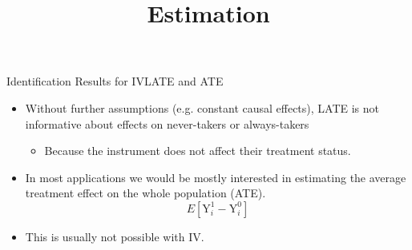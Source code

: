 \documentclass[dvipsnames,hyperref={pdfpagelabels=false}]{beamer}
\begin{document}
\begin{frame}{Identification Results for IV}{LATE and ATE}
	\begin{itemize}
		\item Without further assumptions (e.g. constant causal effects), LATE is not informative about effects on never-takers or always-takers
		\vspace{0.2cm}
		\begin{itemize}
			\item Because the instrument does not affect their treatment status.
			\vspace{0.2cm}
		\end{itemize}
		\item In most applications we would be mostly interested in estimating the average treatment effect on the whole population (ATE).
		\begin{equation*}
		E[\mathrm{Y}^{1}_{i}-\mathrm{Y}^{0}_{i}]
		\end{equation*}
		\item This is usually not possible with IV.
	\end{itemize}
\end{frame}








\title[]  
{Estimation}


\author 
{}

\institute{}






\date
{}


\begin{frame}{}
	\titlepage
\end{frame}
\end{document}
